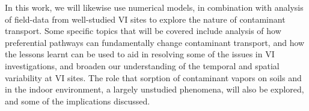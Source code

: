 In this work, we will likewise use numerical models, in combination with analysis of field-data from well-studied VI sites to explore the nature of contaminant transport.
Some specific topics that will be covered include analysis of how preferential pathways can fundamentally change contaminant transport, and how the lessons learnt can be used to aid in resolving some of the issues in VI investigations, and broaden our understanding of the temporal and spatial variability at VI sites.
The role that sorption of contaminant vapors on soils and in the indoor environment, a largely unstudied phenomena, will also be explored, and some of the implications discussed.\par
